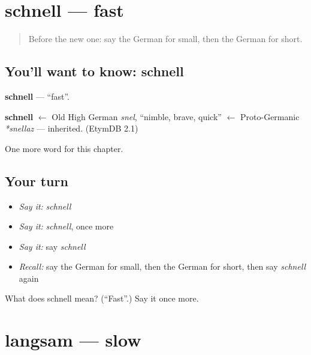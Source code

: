 \section[schnell]{schnell — fast}

\label{lesson:GE-C89-schnell}



\begin{quote}
Before the new one: say the German for small, then the German for short.
\end{quote}

\subsection*{You'll want to know: schnell}
\textbf{schnell} — \textquotedblleft{}fast\textquotedblright{}.

\begin{cousinweb}
\textbf{schnell} $\leftarrow$ Old High German \emph{snel}, \textquotedblleft{}nimble, brave, quick\textquotedblright{} $\leftarrow$ Proto-Germanic \emph{*snellaz} — inherited. (EtymDB 2.1)
\end{cousinweb}

\begin{grammarlens}[title={What you've built}]
One more word for this chapter.
\end{grammarlens}

\subsection*{Your turn}
\begin{itemize}
\raggedright
  \item \emph{Say it:} \emph{schnell}
  \item \emph{Say it:} \emph{schnell}, once more
  \item \emph{Say it:} say \emph{schnell}
  \item \emph{Recall:} say the German for small, then the German for short, then say \emph{schnell} again
\end{itemize}

\begin{tcolorbox}[breakable,colback=teal!4,colframe=teal!35!black,title={Before you move on}]
What does schnell mean? (\textquotedblleft{}Fast\textquotedblright{}.) Say it once more.
\end{tcolorbox}
\section[langsam]{langsam — slow}

